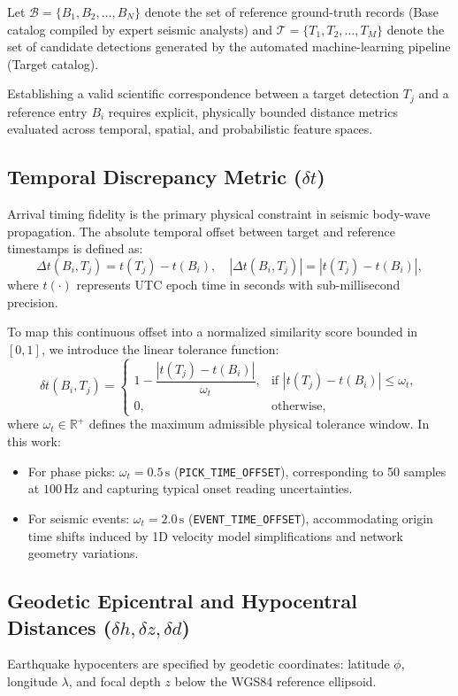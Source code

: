 Let $\mathcal{B} = \{B_1, B_2, \dots, B_N\}$ denote the set of reference ground-truth records (Base catalog compiled by expert seismic analysts) and $\mathcal{T} = \{T_1, T_2, \dots, T_M\}$ denote the set of candidate detections generated by the automated machine-learning pipeline (Target catalog).

Establishing a valid scientific correspondence between a target detection $T_j$ and a reference entry $B_i$ requires explicit, physically bounded distance metrics evaluated across temporal, spatial, and probabilistic feature spaces.

\subsection{Temporal Discrepancy Metric ($\delta t$)}
Arrival timing fidelity is the primary physical constraint in seismic body-wave propagation. The absolute temporal offset between target and reference timestamps is defined as:
\begin{equation}
  \Delta t(B_i, T_j) = t(T_j) - t(B_i), \quad |\Delta t(B_i, T_j)| = |t(T_j) - t(B_i)|,
\end{equation}
where $t(\cdot)$ represents UTC epoch time in seconds with sub-millisecond precision.

To map this continuous offset into a normalized similarity score bounded in $[0, 1]$, we introduce the linear tolerance function:
\begin{equation}
  \delta t(B_i, T_j) = \begin{cases}
    1 - \dfrac{|t(T_j) - t(B_i)|}{\omega_t}, & \text{if } |t(T_j) - t(B_i)| \le \omega_t, \\[8pt]
    0, & \text{otherwise},
  \end{cases}
\end{equation}
where $\omega_t \in \mathbb{R}^+$ defines the maximum admissible physical tolerance window. In this work:
\begin{itemize}
  \item For phase picks: $\omega_t = 0.5\,\mathrm{s}$ (\texttt{PICK\_TIME\_OFFSET}), corresponding to 50 samples at $100\,\mathrm{Hz}$ and capturing typical onset reading uncertainties.
  \item For seismic events: $\omega_t = 2.0\,\mathrm{s}$ (\texttt{EVENT\_TIME\_OFFSET}), accommodating origin time shifts induced by 1D velocity model simplifications and network geometry variations.
\end{itemize}

\subsection{Geodetic Epicentral and Hypocentral Distances ($\delta h, \delta z, \delta d$)}
Earthquake hypocenters are specified by geodetic coordinates: latitude $\phi$, longitude $\lambda$, and focal depth $z$ below the WGS84 reference ellipsoid.

